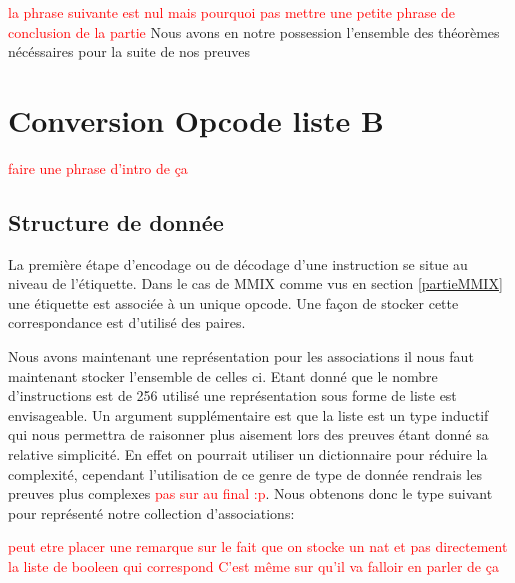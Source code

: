 \documentclass {article}
\newcommand{\codefrom}[3]
           {}
\theoremstyle{definition}
\theoremstyle{remark}
\newcommand{\todo}[1]{\textcolor{red}{#1}}
\begin{document}
\codefrom{src}{binary}{bitnbit}

\todo{la phrase suivante est nul mais pourquoi pas mettre une petite phrase de conclusion de la partie}
Nous avons en notre possession l'ensemble des théorèmes nécéssaires pour la suite de nos preuves




\section{Conversion Opcode liste B}
\label{partieOpcode}

\todo{faire une phrase d'intro de ça}


\subsection{Structure de donnée}
\label{Structure de donnee}
La première étape d'encodage ou de décodage d'une instruction se situe
au niveau de l'étiquette. Dans le cas de MMIX comme vus en section \ref{partieMMIX}
une étiquette est associée à un unique opcode. Une façon de stocker cette
correspondance est d'utilisé des paires.
\codefrom{src}{association_list}{assoc}

Nous avons maintenant une représentation pour les associations il nous faut
maintenant stocker l'ensemble de celles ci. Etant donné que le nombre
d'instructions est de 256 utilisé une représentation sous forme
de liste est envisageable. Un argument supplémentaire est que la liste
est un type inductif qui nous permettra de raisonner plus aisement
lors des preuves étant donné sa relative simplicité. En effet on pourrait utiliser
un dictionnaire pour réduire la complexité, cependant l'utilisation de ce genre
de type de donnée rendrais les preuves plus complexes \todo{pas sur au final :p}.
Nous obtenons donc le type suivant pour représenté notre collection d'associations:

\codefrom{src}{association_list}{tag_opcode_assoc}


\todo{peut etre placer une remarque sur le fait que on stocke un nat et pas directement
  la liste de booleen qui correspond}
\todo{C'est même sur qu'il va falloir en parler de ça}
\end{document}
